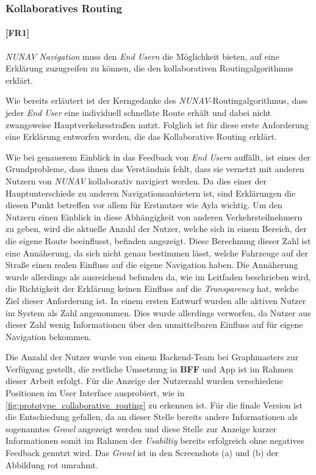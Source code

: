 \subsubsection{Kollaboratives Routing}
\label{sec:user_count_definition}

\paragraph{[FR1]} \textit{NUNAV Navigation} muss den \textit{End Usern} die Möglichkeit bieten, auf eine Erklärung zuzugreifen zu können, die den kollaborativen Routingalgorithmus erklärt.

\bigskip

Wie bereits erläutert ist der Kerngedanke des \textit{NUNAV}-Routingalgorithmus, dass jeder \textit{End User} eine individuell schnellste Route erhält und dabei nicht zwangsweise Hauptverkehrsstraßen nutzt. Folglich ist für diese erste Anforderung eine Erklärung entworfen worden, die das Kollaborative Routing erklärt.

Wie bei genauerem Einblick in das Feedback von \textit{End Usern} auffällt, ist eines der Grundprobleme, dass ihnen das Verständnis fehlt, dass sie vernetzt mit anderen Nutzern von \textit{NUNAV} kollaborativ navigiert werden. Da dies einer der Hauptunterschiede zu anderen Navigationsanbietern ist, sind Erklärungen die diesen Punkt betreffen vor allem für Erstnutzer wie Ayla wichtig. Um den Nutzern einen Einblick in diese Abhängigkeit von anderen Verkehrsteilnehmern zu geben, wird die aktuelle Anzahl der Nutzer, welche sich in einem Bereich, der die eigene Route beeinflusst, befinden angezeigt. Diese Berechnung dieser Zahl ist eine Annäherung, da sich nicht genau bestimmen lässt, welche Fahrzeuge auf der Straße einen realen Einfluss auf die eigene Navigation haben. Die Annäherung wurde allerdings als ausreichend befunden da, wie im Leitfaden beschrieben wird, die Richtigkeit der Erklärung keinen Einfluss auf die \textit{Transparency} hat, welche Ziel dieser Anforderung ist. In einem ersten Entwurf wurden alle aktiven Nutzer im System als Zahl angenommen. Dies wurde allerdings verworfen, da Nutzer aus dieser Zahl wenig Informationen über den unmittelbaren Einfluss auf für eigene Navigation bekommen.

Die Anzahl der Nutzer wurde von einem Backend-Team bei Graphmasters zur Verfügung gestellt, die restliche Umsetzung in \textbf{BFF} und App ist im Rahmen dieser Arbeit erfolgt. Für die Anzeige der Nutzerzahl wurden verschiedene Positionen im User Interface ausprobiert, wie in \autoref{fig:prototype_collaborative_routing} zu erkennen ist. Für die finale Version ist die Entschiedung gefallen, da an dieser Stelle bereits andere Informationen als sogenanntes \textit{Growl} angezeigt werden und diese Stelle zur Anzeige kurzer Informationen somit im Rahmen der \textit{Usabiltiy} bereits erfolgreich ohne negatives Feedback genutzt wird. Das \textit{Growl} ist in den Screenshots (a) und (b) der Abbildung rot umrahmt.

